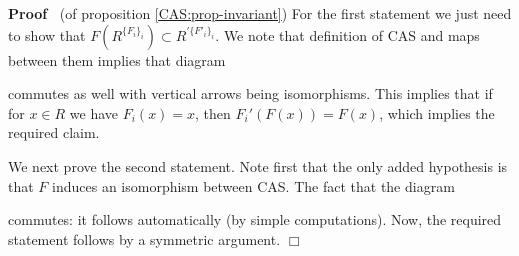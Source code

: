 \documentclass{article}
\newenvironment{proof}{\noindent\textbf{Proof\ }}{\hspace*{\fill}$\Box$\medskip}
\begin{document}
\begin{proof}
  (of proposition \ref{CAS:prop-invariant}) For the first statement we just
  need to show that $F (R^{\{ F_i \}_i}) \subset R^{\prime\{ F'_i \}_i}$. We
  note that definition of CAS and maps between them implies that diagram
  \begin{center}
  \end{center}
  commutes as well with vertical arrows being isomorphisms. This implies that
  if for $x \in R$ we have $F_i (x) = x$, then $F_i' (F (x)) = F (x)$, which
  implies the required claim.
  
  We next prove the second statement. Note first that the only added
  hypothesis is that $F$ induces an isomorphism between CAS. The fact that the
  diagram
  
  \begin{center}
  \end{center}
  
  commutes: it follows automatically (by simple computations). Now, the
  required statement follows by a symmetric argument.
\end{proof}
\end{document}
